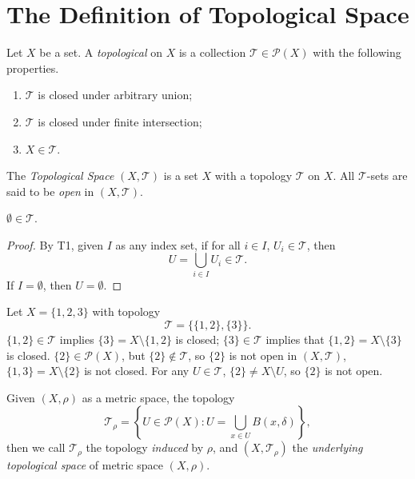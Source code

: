 \section{The Definition of Topological Space}


\begin{definition}
	Let $X$ be a set. A \textit{topological} on $X$ is a collection $\mathcal T \in \mathcal P(X)$ with the following properties.
	\begin{enumerate}[T1.]
		\item $\mathcal T$ is closed under arbitrary union;
		\item $\mathcal T$ is closed under finite intersection;
		\item $X \in \mathcal T$.
	\end{enumerate}
	
	The \textit{Topological Space} $(X, \mathcal T)$ is a set $X$ with a topology $\mathcal T$ on $X$. All $\mathcal T$-sets are said to be \textit{open} in $(X, \mathcal T)$.
\end{definition}


\begin{lemma}
	$\emptyset \in \mathcal T$.
\end{lemma}


\begin{proof}
	By T1, given $I$ as any index set, if for all $i \in I$, $U_i \in \mathcal T$, then
	$$
	U = \bigcup_{i \in I} U_i \in \mathcal T.
	$$
	If $I = \emptyset$, then $U = \emptyset$.
\end{proof}


\begin{note}
	Let $X = \{1,2,3\}$ with topology
	$$
	\mathcal T = \big\{ \{1,2\}, \{3\} \big\}.
	$$
	$\{1,2\} \in \mathcal T$ implies $\{3\} = X \setminus \{1,2\}$ is closed; $\{3\} \in \mathcal T$ implies that $\{1,2\} = X \setminus \{3\}$ is closed. $\{2\} \in \mathcal P(X)$, but $\{2\} \notin \mathcal T$, so $\{2\}$ is not open in $(X, \mathcal T)$, $\{1,3\} = X \setminus \{2\}$ is not closed. For any $U \in \mathcal T$, $\{2\} \ne X \setminus U$, so $\{2\}$ is not open.
\end{note}


\begin{definition}
	Given $(X, \rho)$ as a metric space, the topology
	$$
	\mathcal T_\rho = \left\{U \in \mathcal P(X) : U = \bigcup_{x \in U} B(x, \delta)\right\},
	$$
	then we call $\mathcal T_\rho$ the topology \textit{induced} by $\rho$, and $(X, \mathcal T_\rho)$ the \textit{underlying topological space} of metric space $(X, \rho)$.
\end{definition}


